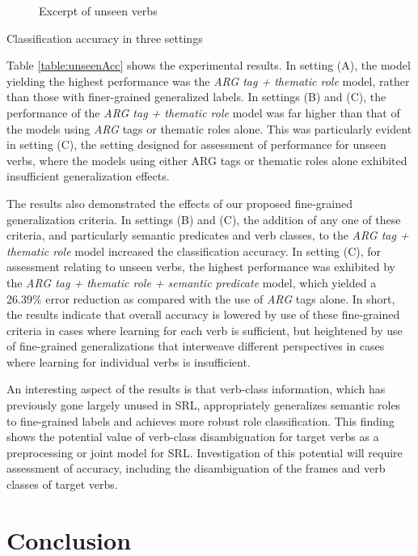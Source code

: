 \documentclass[english]{jnlp_1.4_rep}
\begin{document}
\begin{figure}[b]

\caption{Excerpt of unseen verbs}
\label{unseenList}
\end{figure}
\begin{table}[b]
\caption{Classification accuracy in three settings}
\label{table:unseenAcc}

\end{table}


Table \ref{table:unseenAcc} shows the experimental results. In setting (A), the model yielding the highest performance was the {\it ARG tag + thematic role} model, rather than those with finer-grained generalized labels. In settings (B) and (C), the performance of the {\it ARG tag + thematic role} model was far higher than that of the models using {\it ARG} tags or thematic roles alone. This was particularly evident in setting (C), the setting designed for assessment of performance for unseen verbs, where the models using either ARG tags or thematic roles alone exhibited insufficient generalization effects.

The results also demonstrated the effects of our proposed fine-grained generalization criteria. In settings (B) and (C), the addition of any one of these criteria, and particularly semantic predicates and verb classes, to the {\it ARG tag + thematic role} model increased the classification accuracy. In setting (C), for assessment relating to unseen verbs, the highest performance was exhibited by the {\it ARG tag + thematic role + semantic predicate} model, which yielded a 26.39\% error reduction as compared with the use of {\it ARG} tags alone. In short, the results indicate that overall accuracy is lowered by use of these fine-grained criteria in cases where learning for each verb is sufficient, but heightened by use of fine-grained generalizations that interweave different perspectives in cases where learning for individual verbs is insufficient.

An interesting aspect of the results is that verb-class information, which has previously gone largely unused in SRL, appropriately generalizes semantic roles to fine-grained labels and achieves more robust role classification. This finding shows the potential value of verb-class disambiguation for target verbs as a  preprocessing or joint model for SRL. Investigation of this potential will require assessment of accuracy, including the disambiguation of the frames and verb classes of target verbs.


\section{Conclusion}
\end{document}
